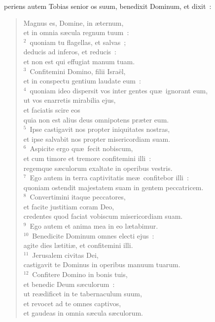 \bchapter
{}periens autem Tobias senior os suum, benedixit Dominum, et dixit~: \begin{flushleft}\begin{verse}\vspace{6pt}Magnus es, Domine, in \ae ternum,\\ et in omnia s\ae cula regnum tuum~:\\
${}^{2}$~quoniam tu flagellas, et salvas~;\\ deducis ad inferos, et reducis~:\\ et non est qui effugiat manum tuam.\\
${}^{3}$~Confitemini Domino, filii Isra\"el,\\ et in conspectu gentium laudate eum~:\\
${}^{4}$~quoniam ideo dispersit vos inter gentes qu\ae\ ignorant eum,\\ ut vos enarretis mirabilia ejus,\\ et faciatis scire eos\\ quia non est alius deus omnipotens pr\ae ter eum.\\
${}^{5}$~Ipse castigavit nos propter iniquitates nostras,\\ et ipse salvabit nos propter misericordiam suam.\\
${}^{6}$~Aspicite ergo qu\ae\ fecit nobiscum,\\ et cum timore et tremore confitemini illi~:\\ regemque s\ae culorum exaltate in operibus vestris.\\
${}^{7}$~Ego autem in terra captivitatis me\ae\ confitebor illi~:\\ quoniam ostendit majestatem suam in gentem peccatricem.\\
${}^{8}$~Convertimini itaque peccatores,\\ et facite justitiam coram Deo,\\ credentes quod faciat vobiscum misericordiam suam.\\
${}^{9}$~Ego autem et anima mea in eo l\ae tabimur.\\
${}^{10}$~Benedicite Dominum omnes electi ejus~:\\ agite dies l\ae titi\ae , et confitemini illi.\\
${}^{11}$~Jerusalem civitas Dei,\\ castigavit te Dominus in operibus manuum tuarum.\\
${}^{12}$~Confitere Domino in bonis tuis,\\ et benedic Deum s\ae culorum~:\\ ut re\ae dificet in te tabernaculum suum,\\ et revocet ad te omnes captivos,\\ et gaudeas in omnia s\ae cula s\ae culorum.\\

\end{verse}
\end{flushleft}
